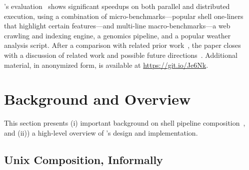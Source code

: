 \documentclass[sigplan,10pt,review,anonymous]{acmart}
\begin{document}
\noindent
\sys's evaluation~ shows significant speedups on both parallel and distributed execution, using a combination of micro-bench\-marks---popular shell one-liners that highlight certain features---and multi-line macro-benchmarks---a web crawling and indexing engine, a genomics pipeline, and a popular weather analysis script.
After a comparison with related prior work~, the paper closes with a discussion of related work and possible future directions~.
Additional material, in anonymized form, is available at
\href{https://git.io/Je6Nk}{https://git.io/Je6Nk}.

% 

\section{Background and Overview}
\label{bg}

This section presents (i) important background on shell pipeline composition~, and (ii)) a high-level overview of \sys's design and implementation.

\subsection{Unix Composition, Informally}
\label{bg:pipelines}
\end{document}
